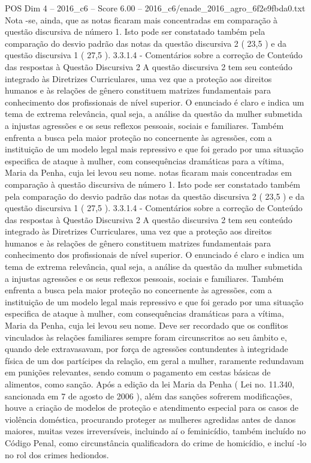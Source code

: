 \begin{textsample}{POS Dim 4 – 2016\_c6 – Score 6.00 – 2016\_c6/enade\_2016\_agro\_6f2e9fbda0.txt}
Nota -se, ainda, que as notas ficaram mais concentradas em comparação à questão discursiva de número 1.
Isto pode ser constatado também pela comparação do desvio padrão das notas da questão discursiva 2 ( 23,5 ) e da questão discursiva 1 ( 27,5 ). 3.3.1.4 - Comentários sobre a correção de Conteúdo das respostas à Questão Discursiva 2 A questão discursiva 2 tem seu conteúdo integrado às Diretrizes Curriculares, uma vez que a proteção aos direitos humanos e às relações de gênero constituem matrizes fundamentais para conhecimento dos profissionais de nível superior.
O enunciado é claro e indica um tema de extrema relevância, qual seja, a análise da questão da mulher submetida a injustas agressões e os seus reflexos pessoais, sociais e familiares.
Também enfrenta a busca pela maior proteção no concernente às agressões, com a instituição de um modelo legal mais repressivo e que foi gerado por uma situação especifica de ataque à mulher, com consequências dramáticas para a vítima, Maria da Penha, cuja lei levou seu nome. notas ficaram mais concentradas em comparação à questão discursiva de número 1.
Isto pode ser constatado também pela comparação do desvio padrão das notas da questão discursiva 2 ( 23,5 ) e da questão discursiva 1 ( 27,5 ). 3.3.1.4 - Comentários sobre a correção de Conteúdo das respostas à Questão Discursiva 2 A questão discursiva 2 tem seu conteúdo integrado às Diretrizes Curriculares, uma vez que a proteção aos direitos humanos e às relações de gênero constituem matrizes fundamentais para conhecimento dos profissionais de nível superior.
O enunciado é claro e indica um tema de extrema relevância, qual seja, a análise da questão da mulher submetida a injustas agressões e os seus reflexos pessoais, sociais e familiares.
Também enfrenta a busca pela maior proteção no concernente às agressões, com a instituição de um modelo legal mais repressivo e que foi gerado por uma situação especifica de ataque à mulher, com consequências dramáticas para a vítima, Maria da Penha, cuja lei levou seu nome.
Deve ser recordado que os conflitos vinculados às relações familiares sempre foram circunscritos ao seu âmbito e, quando dele extravasavam, por força de agressões contundentes à integridade física de um dos partícipes da relação, em geral a mulher, raramente redundavam em punições relevantes, sendo comum o pagamento em cestas básicas de alimentos, como sanção.
Após a edição da lei Maria da Penha ( Lei no. 11.340, sancionada em 7 de agosto de 2006 ), além das sanções sofrerem modificações, houve a criação de modelos de proteção e atendimento especial para os casos de violência doméstica, procurando proteger as mulheres agredidas antes de danos maiores, muitas vezes irreversíveis, incluindo aí o feminicídio, também incluído no Código Penal, como circunstância qualificadora do crime de homicídio, e incluí -lo no rol dos crimes hediondos.

\end{textsample}
